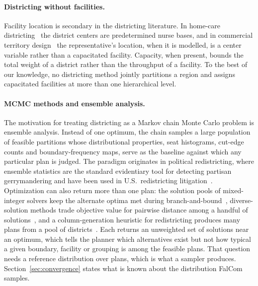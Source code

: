 \documentclass[preprint,12pt,authoryear]{elsarticle}
\theoremstyle{definition}
\begin{document}
\paragraph{Districting without facilities.}
Facility location is secondary in the districting literature. In home-care districting~\citep{blais2003solving} the district centers are predetermined nurse bases, and in commercial territory design~\citep{RIOSMERCADO2009755, rios2013commercial} the representative's location, when it is modelled, is a center variable rather than a capacitated facility. Capacity, when present, bounds the total weight of a district rather than the throughput of a facility. To the best of our knowledge, no districting method jointly partitions a region and assigns capacitated facilities at more than one hierarchical level.

\paragraph{MCMC methods and ensemble analysis.}
The motivation for treating districting as a Markov chain Monte Carlo problem is ensemble analysis. Instead of one optimum, the chain samples a large population of feasible partitions whose distributional properties, seat histograms, cut-edge counts and boundary-frequency maps, serve as the baseline against which any particular plan is judged. The paradigm originates in political redistricting, where ensemble statistics are the standard evidentiary tool for detecting partisan gerrymandering and have been used in U.S.\ redistricting litigation~\citep{chikina2017assessing, deford2021recombination}. Optimization can also return more than one plan: the solution pools of mixed-integer solvers keep the alternate optima met during branch-and-bound~\citep{danna2007generating}, diverse-solution methods trade objective value for pairwise distance among a handful of solutions~\citep{trapp2015finding}, and a column-generation heuristic for redistricting produces many plans from a pool of districts~\citep{gurnee2021fairmandering}. Each returns an unweighted set of solutions near an optimum, which tells the planner which alternatives exist but not how typical a given boundary, facility or grouping is among the feasible plans. That question needs a reference distribution over plans, which is what a sampler produces. Section~\ref{sec:convergence} states what is known about the distribution FalCom samples.
\end{document}
